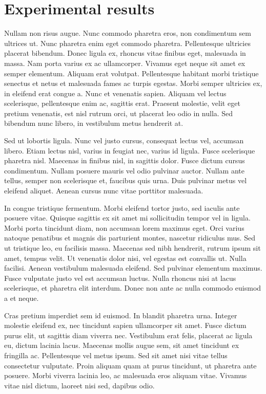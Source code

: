 \documentclass{article}
\begin{document}
\section{Experimental results}
Nullam non risus augue. Nunc commodo pharetra eros, non condimentum sem ultrices ut. Nunc pharetra enim eget commodo pharetra. Pellentesque ultricies placerat bibendum. Donec ligula ex, rhoncus vitae finibus eget, malesuada in massa. Nam porta varius ex ac ullamcorper. Vivamus eget neque sit amet ex semper elementum. Aliquam erat volutpat. Pellentesque habitant morbi tristique senectus et netus et malesuada fames ac turpis egestas. Morbi semper ultricies ex, in eleifend erat congue a. Nunc et venenatis sapien. Aliquam vel lectus scelerisque, pellentesque enim ac, sagittis erat. Praesent molestie, velit eget pretium venenatis, est nisl rutrum orci, ut placerat leo odio in nulla. Sed bibendum nunc libero, in vestibulum metus hendrerit at.

Sed ut lobortis ligula. Nunc vel justo cursus, consequat lectus vel, accumsan libero. Etiam lectus nisl, varius in feugiat nec, varius id ligula. Fusce scelerisque pharetra nisl. Maecenas in finibus nisl, in sagittis dolor. Fusce dictum cursus condimentum. Nullam posuere mauris vel odio pulvinar auctor. Nullam ante tellus, semper non scelerisque et, faucibus quis urna. Duis pulvinar metus vel eleifend aliquet. Aenean cursus nunc vitae porttitor malesuada.

In congue tristique fermentum. Morbi eleifend tortor justo, sed iaculis ante posuere vitae. Quisque sagittis ex sit amet mi sollicitudin tempor vel in ligula. Morbi porta tincidunt diam, non accumsan lorem maximus eget. Orci varius natoque penatibus et magnis dis parturient montes, nascetur ridiculus mus. Sed ut tristique leo, eu facilisis massa. Maecenas sed nibh hendrerit, rutrum ipsum sit amet, tempus velit. Ut venenatis dolor nisi, vel egestas est convallis ut. Nulla facilisi. Aenean vestibulum malesuada eleifend. Sed pulvinar elementum maximus. Fusce vulputate justo vel est accumsan luctus. Nulla rhoncus nisi at lacus scelerisque, et pharetra elit interdum. Donec non ante ac nulla commodo euismod a et neque.

Cras pretium imperdiet sem id euismod. In blandit pharetra urna. Integer molestie eleifend ex, nec tincidunt sapien ullamcorper sit amet. Fusce dictum purus elit, ut sagittis diam viverra nec. Vestibulum erat felis, placerat ac ligula eu, dictum lacinia lacus. Maecenas mollis augue sem, sit amet tincidunt ex fringilla ac. Pellentesque vel metus ipsum. Sed sit amet nisi vitae tellus consectetur vulputate. Proin aliquam quam at purus tincidunt, ut pharetra ante posuere. Morbi viverra lacinia leo, ac malesuada eros aliquam vitae. Vivamus vitae nisl dictum, laoreet nisi sed, dapibus odio.
\end{document}
